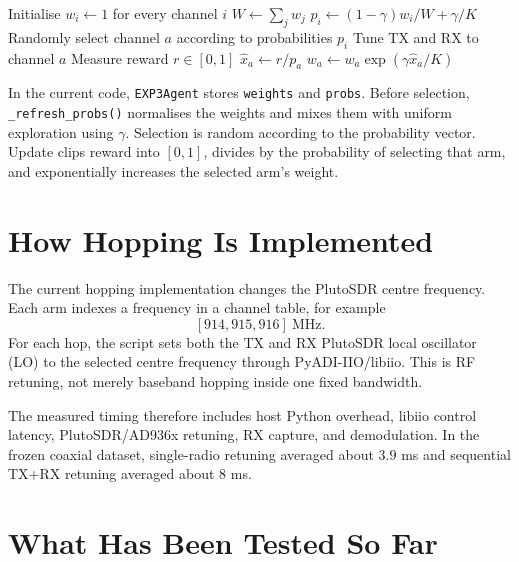 \documentclass[11pt,a4paper]{article}
\begin{document}
\begin{algorithm}[H]
\caption{EXP3 Channel Selection}
\begin{algorithmic}[1]
\State Initialise $w_i \gets 1$ for every channel $i$
    \State $W \gets \sum_j w_j$
        \State $p_i \gets (1-\gamma)w_i/W + \gamma/K$
    \EndFor
    \State Randomly select channel $a$ according to probabilities $p_i$
    \State Tune TX and RX to channel $a$
    \State Measure reward $r \in [0,1]$
    \State $\hat{x}_a \gets r/p_a$
    \State $w_a \gets w_a\exp(\gamma\hat{x}_a/K)$
\EndFor
\end{algorithmic}
\end{algorithm}

\begin{implbox}
In the current code, \texttt{EXP3Agent} stores \texttt{weights} and \texttt{probs}. Before selection, \texttt{\_refresh\_probs()} normalises the weights and mixes them with uniform exploration using $\gamma$. Selection is random according to the probability vector. Update clips reward into $[0,1]$, divides by the probability of selecting that arm, and exponentially increases the selected arm's weight.
\end{implbox}

\section{How Hopping Is Implemented}

\begin{resultbox}
The current hopping implementation changes the PlutoSDR centre frequency. Each arm indexes a frequency in a channel table, for example
\[
    [914, 915, 916]~\mathrm{MHz}.
\]
For each hop, the script sets both the TX and RX PlutoSDR local oscillator (LO) to the selected centre frequency through PyADI-IIO/libiio. This is RF retuning, not merely baseband hopping inside one fixed bandwidth.
\end{resultbox}

The measured timing therefore includes host Python overhead, libiio control latency, PlutoSDR/AD936x retuning, RX capture, and demodulation. In the frozen coaxial dataset, single-radio retuning averaged about $3.9$ ms and sequential TX+RX retuning averaged about $8$ ms.

\section{What Has Been Tested So Far}
\end{document}
